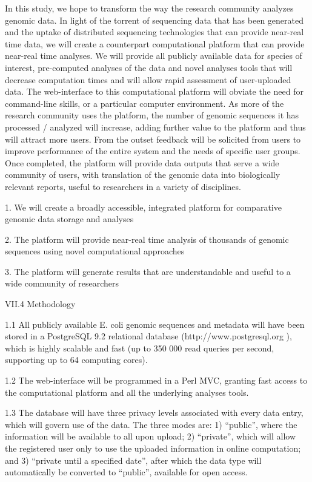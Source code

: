 \documentclass[letterpaper,12pt]{report}
\begin{document}
In this study, we hope to transform the way the research community analyzes genomic data. In light of the torrent of sequencing data that has been generated and the uptake of distributed sequencing technologies that can provide near-real time data, we will create a counterpart computational platform that can provide near-real time analyses. We will provide all publicly available data for species of interest, pre-computed analyses of the data and novel analyses tools that will decrease computation times and will allow rapid assessment of user-uploaded data. The web-interface to this computational platform will obviate the need for command-line skills, or a particular computer environment. As more of the research community uses the platform, the number of genomic sequences it has processed / analyzed will increase, adding further value to the platform and thus will attract more users. From the outset feedback will be solicited from users to improve performance of the entire system and the needs of specific user groups.   Once completed, the platform will provide data outputs that serve a wide community of users, with translation of the genomic data into biologically relevant reports, useful to researchers in a variety of disciplines.


1. We will create a broadly accessible, integrated platform for comparative genomic data storage and analyses

2. The platform will provide near-real time analysis of thousands of genomic sequences using novel computational approaches

3. The platform will generate results that are understandable and useful to a wide community of researchers



VII.4 Methodology

1.1 All publicly available E. coli genomic sequences and metadata will have been stored in a PostgreSQL 9.2 relational database (http://www.postgresql.org ), which is highly scalable and fast (up to 350 000 read queries per second, supporting up to 64 computing cores).

 
1.2 The web-interface will be programmed in a Perl MVC, granting fast access to the computational platform and all the underlying analyses tools.  

1.3 The database will have three privacy levels associated with every data entry, which will govern use of the data. The three modes are: 1) “public”, where the information will be available to all upon upload; 2) “private”, which will allow the registered user only to use the uploaded information in online computation; and 3) “private until a specified date”, after which the data type will automatically be converted to “public”, available for open access.
\end{document}
